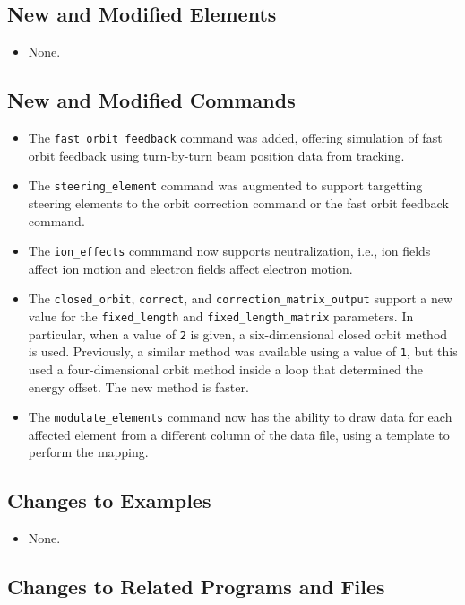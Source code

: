 \documentclass[11pt]{article}
\begin{document}
\subsection{New and Modified Elements}
\begin{itemize}
\item None.
\end{itemize}

\subsection{New and Modified Commands}
\begin{itemize}
\item The \verb|fast_orbit_feedback| command was added, offering simulation of fast orbit feedback using
  turn-by-turn beam position data from tracking.
\item The \verb|steering_element| command was augmented to support targetting steering elements to the
  orbit correction command or the fast orbit feedback command.
\item The \verb|ion_effects| commmand now supports neutralization, i.e., ion fields affect ion motion and
  electron fields affect electron motion.
\item The \verb|closed_orbit|, \verb|correct|, and \verb|correction_matrix_output| support a new value for the
  \verb|fixed_length| and \verb|fixed_length_matrix| parameters. In particular, when a value of \verb|2| is given, a
  six-dimensional closed orbit method is used.  Previously, a similar method was available using a value of \verb|1|,
  but this used a four-dimensional orbit method inside a loop that determined the energy offset. The new method is
  faster.
\item The \verb|modulate_elements| command now has the ability to draw data for each affected element from
  a different column of the data file, using a template to perform the mapping.
\end{itemize}

\subsection{Changes to Examples}

\begin{itemize}
\item None.
\end{itemize}

\subsection{Changes to Related Programs and Files}
\end{document}
